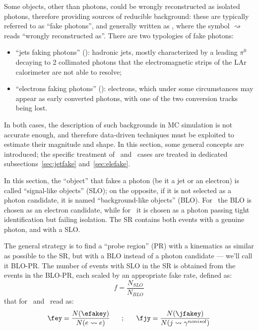 
Some objects, other than photons, could be wrongly reconstructed as isolated photons, therefore providing sources of reducible background: these are typically referred to as ``fake photons'', and generally written as \fakey, where the symbol $\rightsquigarrow$ reads ``wrongly reconstructed as''.
There are two typologies of fake photons:
\begin{itemize}
\item ``jets faking photons'' (\jfakey): hadronic jets, mostly characterized by a leading $\pi^0$ decaying to 2 collimated photons that the electromagnetic strips of the LAr calorimeter are not able to resolve;
\item ``electrons faking photons'' (\efakey): electrons, which under some circumstances may appear as early converted photons, with one of the two conversion tracks being lost.
\end{itemize}
In both cases, the description of such backgrounds in MC simulation is not accurate enough, and therefore data-driven techniques must be exploited to estimate their magnitude and shape. In this section, some general concepts are introduced; the specific treatment of \efakey\ and \jfakey\ cases are treated in dedicated subsections~\ref{sec:jetfake} and~\ref{sec:elefake}.

In this section, the ``object'' that fakes a photon (be it a jet or an electron) is called ``signal-like objects'' (SLO); on the opposite, if it is not selected as a photon candidate, it is named ``background-like objects'' (BLO).
For \efakey\ the BLO is chosen as an electron candidate, while for \jfakey\ it is chosen as a photon passing tight identification but failing isolation.
The SR contains both events with a genuine photon, and with a SLO. 

The general strategy is to find a ``probe region'' (PR) with a kinematics as similar as possible to the SR, but with a BLO instead of a photon candidate --- we'll call it BLO-PR. The number of events with SLO in the SR is obtained from the events in the BLO-PR, each scaled by an appropriate fake rate, defined as:
\begin{equation}
  f = \frac{N_{SLO}}{N_{BLO}}
  \label{eq:fakerate}
\end{equation}
that for \efakey\ and \jfakey\ read as:
\begin{equation}                                                                                                                                                                                                                                    
  \fey=\frac{N(\efakey)}{N(e\rightsquigarrow e)}
  ~~~~~;~~~~~
  \fjy=\frac{N(\jfakey)}{N(j\rightsquigarrow\gamma^{nonisol})}
  \label{eq:fey-fjy}
\end{equation}

